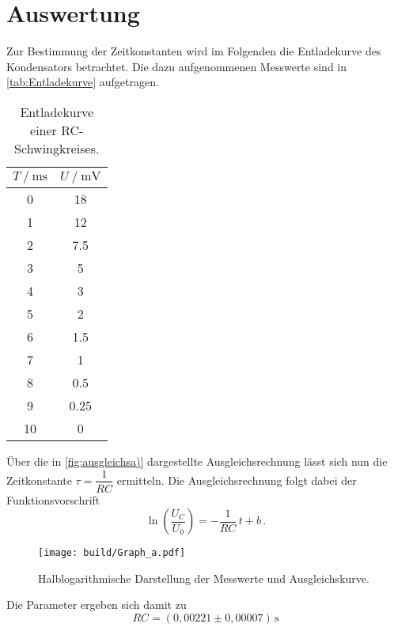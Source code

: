 \section{Auswertung}
\label{sec:Auswertung}

Zur Bestimmung der Zeitkonstanten wird im Folgenden die Entladekurve des Kondensators betrachtet.
Die dazu aufgenommenen Messwerte sind in \autoref{tab:Entladekurve} aufgetragen. 

\begin{table}[H]
  \centering
  \caption{Entladekurve einer RC-Schwingkreises.}
  \label{tab:Entladekurve}
  \begin{tabular}{S S}
    \toprule
    {$T \mathbin{/} \unit{\milli\second} $} &  {$ U \mathbin{/} \unit{\milli\volt}$} \\
          &         18     \\
            1      &         12     \\
            2      &         7.5    \\
            3      &         5      \\
            4      &         3      \\
            5      &         2      \\
            6      &         1.5    \\
            7      &         1      \\
            8      &         0.5    \\
            9      &         0.25   \\
            10     &         0      \\
  \end{tabular}
\end{table}

Über die in \autoref{fig:ausgleichsa)} dargestellte Ausgleichsrechnung lässt sich nun die Zeitkonstante $τ = \dfrac{1}{RC}$ ermitteln.
Die Ausgleichsrechnung folgt dabei der Funktionsvorschrift
\begin{equation*}
  \ln \left(\frac{U_C}{U_0}\right) = -\frac{1}{RC} \,t + b \,.
\end{equation*}

\begin{figure}[H]
  \centering
  \texttt{[image: build/Graph\_a.pdf]}
  \caption{Halblogarithmische Darstellung der Messwerte und Ausgleichskurve.}
  \label{fig:ausgleichsa)}
\end{figure}

Die Parameter ergeben sich damit zu 
\begin{equation*}
  RC = (0,00221 \pm 0,00007) \,\unit{\second}
\end{equation*} 

